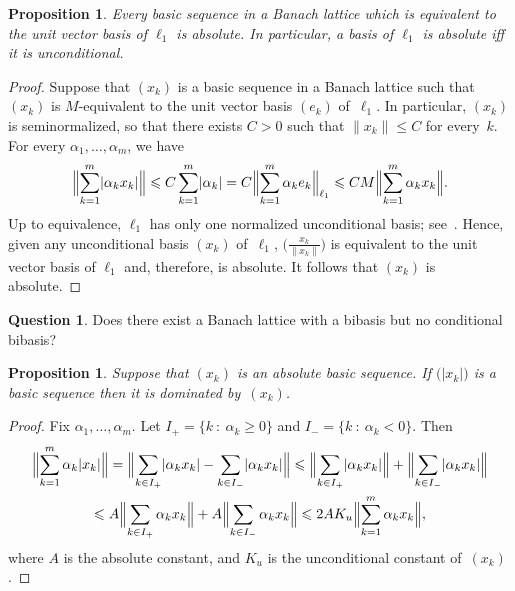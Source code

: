 \documentclass[12pt]{amsart}
\theoremstyle{plain}
\newtheorem{proposition}[theorem]{Proposition}
\theoremstyle{definition}
\newtheorem{question}[theorem]{Question}
\newcommand{\abs}[1]{\lvert#1\rvert}
\newcommand{\norm}[1]{\lVert#1\rVert}
\newcommand{\Bignorm}[1]{\Bigl\lVert#1\Bigr\rVert}
\renewcommand{\mid}{\::\:}
\renewcommand{\le}{\leqslant}
\renewcommand{\ge}{\geqslant}
\begin{document}
\begin{proposition}\label{l1-abs}
  Every basic sequence in a Banach lattice which is equivalent to the
  unit vector basis of $\ell_1$ is absolute. In particular, a basis of
  $\ell_1$ is absolute iff it is unconditional.
\end{proposition}

\begin{proof}
  Suppose that $(x_k)$ is a basic sequence in a Banach lattice such
  that $(x_k)$ is $M$-equivalent to the unit vector basis $(e_k)$
  of~$\ell_1$. In particular, $(x_k)$ is seminormalized, so that there
  exists $C>0$ such that $\norm{x_k}\le C$ for every~$k$. For every
  $\alpha_1,\dots,\alpha_m$, we have
  \begin{displaymath}
    \Bignorm{\sum_{k=1}^m\abs{\alpha_kx_k}}
    \le C\sum_{k=1}^m\abs{\alpha_k}
    =C\Bignorm{\sum_{k=1}^m\alpha_ke_k}_{\ell_1}
    \le CM\Bignorm{\sum_{k=1}^m\alpha_kx_k}.
  \end{displaymath}
  Up to equivalence, $\ell_1$ has only one normalized unconditional
  basis; see~\cite[Proposition~2.b.9]{Lindenstrauss:77}. Hence, given
  any unconditional basis $(x_k)$ of~$\ell_1$,
  $\bigl(\frac{x_k}{\norm{x_k}}\bigr)$ is equivalent to the unit
  vector basis of $\ell_1$ and, therefore, is absolute. It follows
  that $(x_k)$ is absolute.
\end{proof}

\begin{question}
  Does there exist a Banach lattice with a bibasis but no conditional
  bibasis?
\end{question}

\begin{proposition}
  Suppose that $(x_k)$ is an absolute basic sequence. If
  $\bigl(\abs{x_k}\bigr)$ is a basic sequence then it is dominated by~$(x_k)$.
\end{proposition}

\begin{proof}
  Fix $\alpha_1,\dots,\alpha_m$. Let $I_+=\{k\mid \alpha_k\ge 0\}$ and
  $I_-=\{k\mid \alpha_k< 0\}$. Then
  \begin{multline*}
    \Bignorm{\sum_{k=1}^m\alpha_k\abs{x_k}}
    =\Bignorm{\sum_{k\in I_+}\abs{\alpha_kx_k}-
      \sum_{k\in I_-}\abs{\alpha_kx_k}}
    \le\Bignorm{\sum_{k\in I_+}\abs{\alpha_kx_k}}
    +\Bignorm{\sum_{k\in I_-}\abs{\alpha_kx_k}}\\
    \le A\Bignorm{\sum_{k\in I_+}\alpha_kx_k}
    +A\Bignorm{\sum_{k\in I_-}\alpha_kx_k}
    \le 2AK_u\Bignorm{\sum_{k=1}^m\alpha_kx_k},
  \end{multline*}
  where $A$ is the absolute constant, and $K_u$ is the
  unconditional constant of~$(x_k)$. 
\end{proof}
\end{document}
